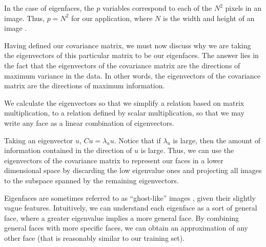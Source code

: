 \documentclass[12pt]{report}
\begin{document}

            In the case of eigenfaces, the $p$ variables correspond to each of the $N^2$ pixels in an image. Thus, $p = N^2$ for our application, where $N$ is the width and height of an image \cite{Janakiev2018}.

            Having defined our covariance matrix, we must now discuss why we are taking the eigenvectors of this particular matrix to be our eigenfaces. The answer lies in the fact that the eigenvectors of the covariance matrix are the directions of maximum variance in the data. In other words, the eigenvectors of the covariance matrix are the directions of maximum information. %

            We calculate the eigenvectors so that we simplify a relation based on matrix multiplication, to a relation defined by scalar multiplication, so that we may write any face as a linear combination of eigenvectors.

            Taking an eigenvector $u$, $Cu=\lambda_u u$. Notice that if $\lambda_u$ is large, then the amount of information contained in the direction of $u$ is large. Thus, we can use the eigenvectors of the covariance matrix to represent our faces in a lower dimensional space by discarding the low eigenvalue ones and projecting all images to the subspace spanned by the remaining eigenvectors.

            Eigenfaces are sometimes referred to as ``ghost-like'' images \cite{Dusenberry2015}, given their slightly vague features. Intuitively, we can understand each eigenface as a sort of general face, where a greater eigenvalue implies a more general face. By combining general faces with more specific faces, we can obtain an approximation of any other face (that is reasonably similar to our training set).
\end{document}
